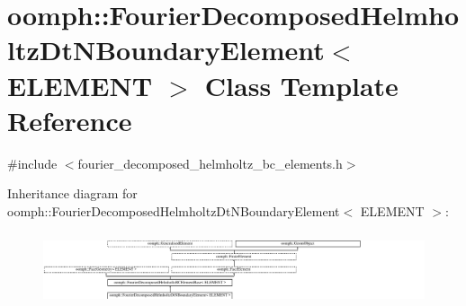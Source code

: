 \hypertarget{classoomph_1_1FourierDecomposedHelmholtzDtNBoundaryElement}{}\section{oomph\+:\+:Fourier\+Decomposed\+Helmholtz\+Dt\+N\+Boundary\+Element$<$ E\+L\+E\+M\+E\+NT $>$ Class Template Reference}
\label{classoomph_1_1FourierDecomposedHelmholtzDtNBoundaryElement}


{\ttfamily \#include $<$fourier\+\_\+decomposed\+\_\+helmholtz\+\_\+bc\+\_\+elements.\+h$>$}

Inheritance diagram for oomph\+:\+:Fourier\+Decomposed\+Helmholtz\+Dt\+N\+Boundary\+Element$<$ E\+L\+E\+M\+E\+NT $>$\+:\begin{figure}[H]
\begin{center}
\leavevmode
\includegraphics[height=2.150538cm]{classoomph_1_1FourierDecomposedHelmholtzDtNBoundaryElement}
\end{center}
\end{figure}
